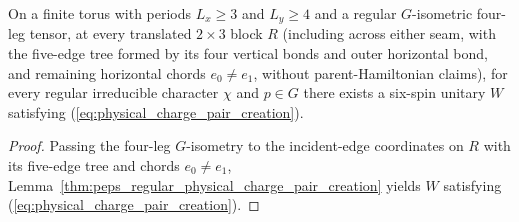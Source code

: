 \begin{lemma}
    \label{thm:peps_torus_physical_charge_pair_creation}
    \leanok
    On a finite torus with periods $L_x\ge 3$ and $L_y\ge 4$ and a regular $G$-isometric four-leg tensor, at every translated $2\times 3$ block $R$ (including across either seam, with the five-edge tree formed by its four vertical bonds and outer horizontal bond, and remaining horizontal chords $e_0\neq e_1$, without parent-Hamiltonian claims), for every regular irreducible character $\chi$ and $p\in G$ there exists a six-spin unitary $W$ satisfying (\ref{eq:physical_charge_pair_creation}).
\end{lemma}
\begin{proof}\leanok
    Passing the four-leg $G$-isometry to the incident-edge coordinates on $R$ with its five-edge tree and chords $e_0\neq e_1$, Lemma~\ref{thm:peps_regular_physical_charge_pair_creation} yields $W$ satisfying (\ref{eq:physical_charge_pair_creation}).
\end{proof}
